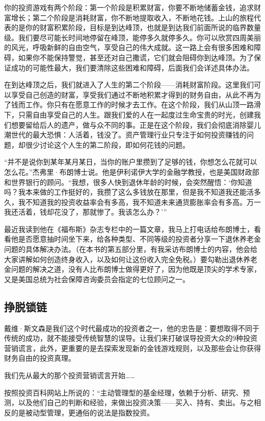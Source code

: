 你的投资游戏有两个阶段：第一个阶段是积累财富，你要不断地储蓄金钱，追求财富增长；第二个阶段是消耗财富，你不断地提取收入，不断地花钱。上山的旅程代表的是你的财富积累阶段，目标是到达峰顶，也就是到达我们前面所说的临界数量级。我们要尽可能长时间地停留在峰顶，能停多久就停多久。你可以欣赏四周美丽的风光，呼吸新鲜的自由空气，享受自己的伟大成就。这一路上会有很多困难和障碍，如果你不能保持警觉，甚至还对自己撒谎，它们就会阻碍你到达峰顶。为了保证成功的可能性最大，我们要清除这些困难和障碍，后面我们会详述具体办法。

在到达峰顶之后，我们就进入了人生的第二个阶段——消耗财富阶段。这里我们可以享受自己创造的财富，享受我们通过不断地积累才得到的财务自由，从此不再为了钱而工作。你只有在愿意工作的时候才去工作。在这个阶段，我们从山顶一路滑下，只需自由享受自己的人生。跟我们爱的人在一起度过生命宝贵的时光，创建我们想要留给后人的遗产，做与众不同的事。正是在这个阶段，我们会彻底消除婴儿潮世代的最大恐惧：人活着，钱没了。资产管理行业只专注于如何投资赚钱的问题，却很少讨论这个人生的第二阶段，即如何花钱的问题。

“并不是说你到某年某月某日，当你的账户里攒到了足够的钱，你想怎么花就可以怎么花。”杰弗里·布朗博士说。他是伊利诺伊大学的金融学教授，也是美国财政部和世界银行的顾问。“我想，很多人快到退休年龄的时候，会突然醒悟：‘你知道吗？我本来做的工作挺好的，我攒了这么多钱放在那里，但是我不知道我还能活多久，我不知道我的投资收益率会有多高，我不知道未来通货膨胀率会有多高。万一我还活着，钱却花没了，那就惨了。我该怎么办？’”

最近我读到他在《福布斯》杂志专栏中的一篇文章，我马上打电话给布朗博士，看看他是否愿意抽时间坐下来，给各种类型、不同等级的投资者分享一下退休养老金问题的具体解决办法。（在本书的第五部分里，有我采访布朗博士的内容，他会给大家讲解如何创造终身收入，以及如何让这份收入完全免税。）要勾勒出退休养老金问题的解决之道，没有人比布朗博士做得更好了，因为他既是顶尖的学术专家，又是美国总统为社会保障咨询委员会指定的七位顾问之一。

\subsection{挣脱锁链}

戴维·斯文森是我们这个时代最成功的投资者之一，他的忠告是：要想取得不同于传统的成功，就不能接受传统智慧的误导。让我们来打破误导投资大众的9种投资营销谎言，此外，更重要的是去探索发现新的金钱游戏规则，以及那些会让你获得财务自由的投资真理。

我们先从最大的那个投资营销谎言开始……

按照投资百科网站上所说的：“主动管理型的基金经理，依赖于分析、研究、预测，以及他们自己的判断和经验，来做出投资决策——买入、持有、卖出。与之相反的是被动型管理，更通俗的说法是指数投资。
